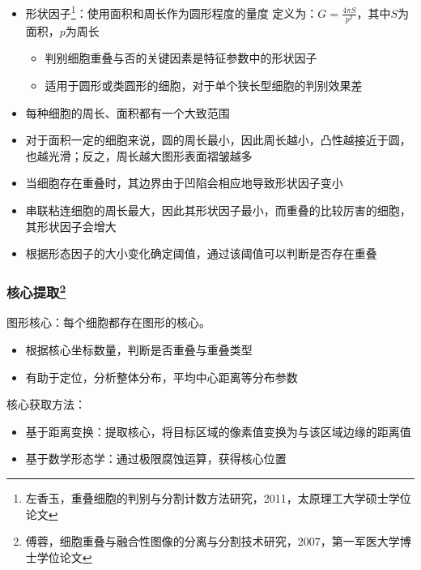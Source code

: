 \documentclass[notheorems,mathserif,table,compress]{beamer}  %
\begin{document}
\begin{frame}
   \begin{itemize}
   \item 形状因子\footnote{左香玉，重叠细胞的判别与分割计数方法研究，2011，太原理工大学硕士学位论文}：使用面积和周长作为圆形程度的量度\newline
定义为：$G=\frac{4\pi S}{p^2}$，其中$S$为面积，$p$为周长 \\
   	\begin{itemize}
   	\item 判别细胞重叠与否的关键因素是特征参数中的形状因子
  	 \item 适用于圆形或类圆形的细胞，对于单个狭长型细胞的判别效果差
  	\end{itemize}
   \end{itemize}
\end{frame}



\begin{frame}
   \begin{itemize}
    \item 每种细胞的周长、面积都有一个大致范围
    \item 对于面积一定的细胞来说，圆的周长最小，因此周长越小，凸性越接近于圆，也越光滑；反之，周长越大图形表面褶皱越多
    \item 当细胞存在重叠时，其边界由于凹陷会相应地导致形状因子变小
    \item 串联粘连细胞的周长最大，因此其形状因子最小，而重叠的比较厉害的细胞，其形状因子会增大
    \item 根据形态因子的大小变化确定阈值，通过该阈值可以判断是否存在重叠
  \end{itemize}
\end{frame}



\begin{frame}
  \frametitle{核心提取\footnote{傅蓉，细胞重叠与融合性图像的分离与分割技术研究，2007，第一军医大学博士学位论文}}
  图形核心：每个细胞都存在图形的核心。
  \begin{itemize}
  \item 根据核心坐标数量，判断是否重叠与重叠类型
  \item 有助于定位，分析整体分布，平均中心距离等分布参数\newline
  \end{itemize}
  核心获取方法：
  \begin{itemize}
  \item 基于距离变换：提取核心，将目标区域的像素值变换为与该区域边缘的距离值
  \item 基于数学形态学：通过极限腐蚀运算，获得核心位置
  \end{itemize}
\end{frame}
\end{document}
